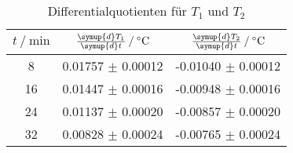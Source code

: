 \begin{table}
        \centering
        \label{tab:differentialquotienten}
        \begin{tabular}{c c c}
        \toprule
        $t \mathbin{/} \si{\minute} $ & $\frac{\symup{d}T_1}{\symup{d}t} \mathbin{/} \si{\celsius}$ & $\frac{\symup{d}T_2}{\symup{d}t} \mathbin{/} \si{\celsius}$ \\
        \midrule
        8  & 0.01757 $\pm$ 0.00012 & -0.01040 $\pm$ 0.00012 \\
        16 & 0.01447 $\pm$ 0.00016 & -0.00948 $\pm$ 0.00016\\
        24 & 0.01137 $\pm$ 0.00020 & -0.00857 $\pm$ 0.00020 \\
        32 & 0.00828 $\pm$ 0.00024 & -0.00765 $\pm$ 0.00024 \\
        \bottomrule
        \end{tabular}
        \caption{Differentialquotienten für $T_1$ und $T_2$}
        \end{table}